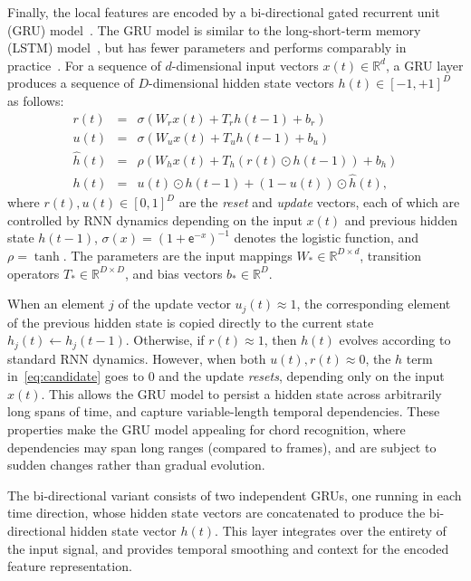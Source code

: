 \documentclass{article}
\begin{document}
Finally, the local features are encoded by a bi-directional gated recurrent unit (GRU) model~\cite{cho2014learning}.
The GRU model is similar to the long-short-term memory (LSTM) model~\cite{hochreiter1997long}, but has fewer parameters and performs comparably in practice~\cite{jozefowicz2015empirical}.
For a sequence of $d$-dimensional input vectors $x(t) \in \mathbb{R}^d$, a GRU layer produces a sequence of $D$-dimensional hidden state vectors $h(t) \in {[-1, +1]}^D$ as follows:
\begin{eqnarray}
    r(t) &=& \sigma\left(W_r x(t) + T_r h(t-1) + b_r\right)\\
    u(t) &=& \sigma\left(W_u x(t) + T_u h(t-1) + b_u\right)\\
    \hat{h}(t) &=& \rho\left(W_h x(t) + T_h \left( r(t) \odot h(t-1) \right) + b_h \right)\label{eq:candidate}\\
    h(t) &=& u(t) \odot h(t-1) + (1-u(t)) \odot \hat{h}(t),
\end{eqnarray}
where $r(t), u(t) \in {[0,1]}^D$ are the \emph{reset} and \emph{update} vectors, each of which are controlled by RNN dynamics depending on the input $x(t)$ and previous hidden state $h(t-1)$, ${\sigma(x)={(1+\mathsf{e}^{-x})}^{-1}}$ denotes the logistic function, and $\rho = \tanh$.
The parameters are the input mappings $W_* \in \mathbb{R}^{D\times d}$, transition operators $T_* \in \mathbb{R}^{D\times D}$, and bias vectors $b_* \in \mathbb{R}^D$.

When an element $j$ of the update vector ${u_j(t)} \approx 1$, the corresponding element of the previous hidden state is copied directly to the current state ${h_j(t)} \leftarrow {h_j(t-1)}$.
Otherwise, if $r(t) \approx 1$, then $h(t)$ evolves according to standard RNN dynamics.
However, when both $u(t), r(t) \approx 0$, the $h$ term in~\eqref{eq:candidate} goes to 0 and the update \emph{resets}, depending only on the input $x(t)$.
This allows the GRU model to persist a hidden state across arbitrarily long spans of time, and capture variable-length temporal dependencies.
These properties make the GRU model appealing for chord recognition, where dependencies may span long ranges (compared to frames), and are subject to sudden changes rather than gradual evolution.

The bi-directional variant consists of two independent GRUs, one running in each time direction, whose hidden state vectors are concatenated to produce the bi-directional hidden state vector $h(t)$.
This layer integrates over the entirety of the input signal, and provides temporal smoothing and context for the encoded feature representation.
\end{document}
